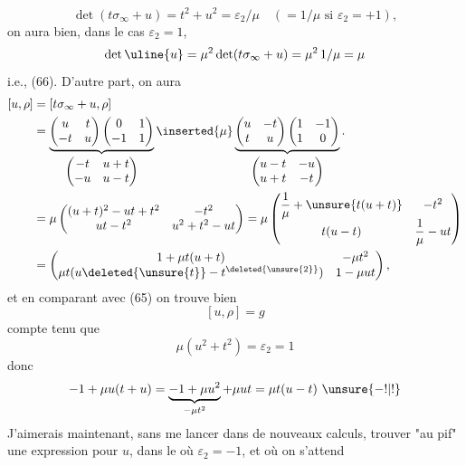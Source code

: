 \[
\det(t\sigma_\infty+u)=t^2+u^2=\varepsilon_2/\mu
\quad(=1/\mu\text{ si }\varepsilon_2=+1),
\]
on aura bien, dans le cas $\varepsilon_2=1$, 
\[
\det\uline{u}=\mu^2\det(t\sigma_\infty+u)=\mu^2\,1/\mu=\mu
\]
i.e., (66). D'autre part, on aura
\[
\begin{aligned}
[u,\rho]&=[t\sigma_\infty+u,\rho]\\
&=
\underbrace{
\begin{pmatrix}u&t\\-t&u\end{pmatrix}
\begin{pmatrix}0&1\\-1&1\end{pmatrix}
}_{\begin{pmatrix}-t&u+t\\-u&u-t\end{pmatrix}}
\inserted{\mu}
\underbrace{
\begin{pmatrix}u&-t\\t&u\end{pmatrix}
\begin{pmatrix}1&-1\\1&0\end{pmatrix}
}_{\begin{pmatrix}u-t&-u\\u+t&-t\end{pmatrix}}.
\\
&=\mu\begin{pmatrix}
(u+t)^2-ut+t^2&-t^2\\
ut-t^2&u^2+t^2-ut
\end{pmatrix}
=\mu\begin{pmatrix}
\dfrac1\mu+\unsure{t(u+t)}&-t^2\\
t(u-t)&\dfrac1\mu-ut
\end{pmatrix}
\\
&=\begin{pmatrix}
1+\mu t(u+t)&-\mu t^2\\
\mu t(u\deleted{\unsure{t}}-t^{\deleted{\unsure{2}}})&1-\mu ut
\end{pmatrix},
\end{aligned}
\]
et en comparant avec (65) on trouve bien
\[
[u,\rho]=g
\]
compte tenu que
\[
\mu(u^2+t^2)=\varepsilon_2=1
\]
donc
\[
-1+\mu u(t+u)=\underbrace{-1+\mu u^2}_{-\mu t^2}+\mu ut
=\mu t(u-t)\ \unsure{-!|!}
\]
J'aimerais maintenant, sans me lancer dans de
nouveaux calculs, trouver "au pif" une expression
pour $u$, dans le  où $\varepsilon_2=-1$, et où on s'attend

